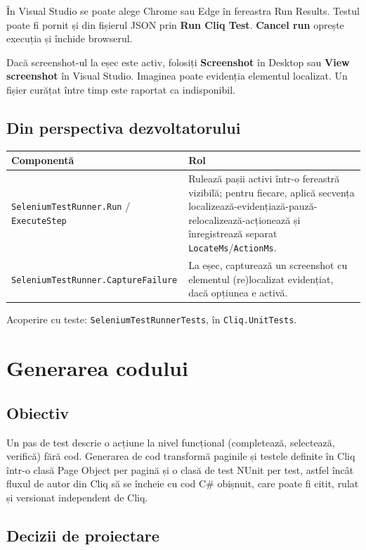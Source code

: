 \documentclass[12pt,a4paper]{report}
\newcommand{\UI}[1]{\textbf{#1}}
\newcommand{\File}[1]{\nolinkurl{#1}}
\begin{document}
În Visual Studio se poate alege Chrome sau Edge în fereastra Run Results. Testul poate fi pornit și din fișierul JSON prin \UI{Run Cliq Test}. \UI{Cancel run} oprește execuția și închide browserul.

Dacă screenshot-ul la eșec este activ, folosiți \UI{Screenshot} în Desktop sau \UI{View screenshot} în Visual Studio. Imaginea poate evidenția elementul localizat. Un fișier curățat între timp este raportat ca indisponibil.

\section{Din perspectiva dezvoltatorului}

\begin{tabularx}{\textwidth}{@{}p{5.3cm}Y@{}}
\toprule \textbf{Componentă} & \textbf{Rol} \\
\midrule
\File{SeleniumTestRunner.Run} / \File{ExecuteStep} & Rulează pașii activi într-o fereastră vizibilă; pentru fiecare, aplică secvența localizează-evidențiază-pauză-relocalizează-acționează și înregistrează separat \File{LocateMs}/\File{ActionMs}. \\
\File{SeleniumTestRunner.CaptureFailure} & La eșec, capturează un screenshot cu elementul (re)localizat evidențiat, dacă opțiunea e activă. \\
\bottomrule
\end{tabularx}

Acoperire cu teste: \File{SeleniumTestRunnerTests}, în \File{Cliq.UnitTests}.

\chapter{Generarea codului}

\section{Obiectiv}

Un pas de test descrie o acțiune la nivel funcțional (completează, selectează, verifică) fără cod. Generarea de cod transformă paginile și testele definite în Cliq într-o clasă Page Object per pagină și o clasă de test NUnit per test, astfel încât fluxul de autor din Cliq să se încheie cu cod C\# obișnuit, care poate fi citit, rulat și versionat independent de Cliq.

\section{Decizii de proiectare}
\end{document}
